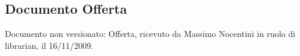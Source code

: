 \subsection{Documento Offerta}
Documento non versionato: Offerta, ricevuto da Massimo Nocentini in ruolo di librarian, il 16/11/2009.
